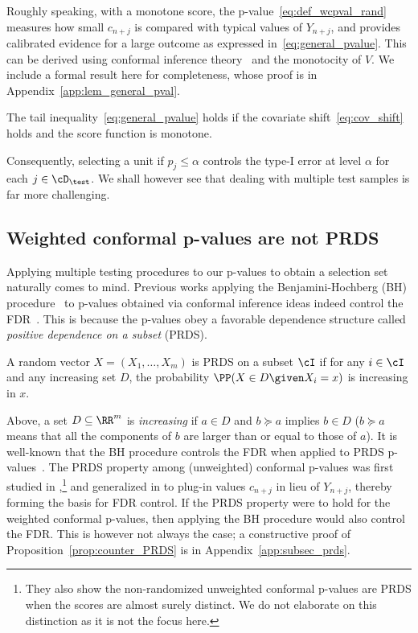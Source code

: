 {Roughly speaking, with a monotone score,
the p-value~\eqref{eq:def_wcpval_rand}
measures how small $c_{n+j}$ is compared with
typical values of $Y_{n+j}$, and provides calibrated
evidence for a large outcome as expressed in~\eqref{eq:general_pvalue}.
This can be derived using conformal inference theory~\cite{tibshirani2019conformal} and the monotocity of $V$. We include a formal result here for completeness, whose proof is
in Appendix~\ref{app:lem_general_pval}.}

\begin{lemma}\label{lem:general_pval}
The tail inequality~\eqref{eq:general_pvalue} holds
if the covariate shift~\eqref{eq:cov_shift} holds and the score function is monotone.
\end{lemma}
Consequently, selecting a unit
if $p_j \le \alpha$ controls the type-I error at level $\alpha$ for each $j\in \cD_\test$.
We shall however see that dealing with multiple test samples
is far more challenging.


\subsection{Weighted conformal p-values are not PRDS}
\label{subsec:no_PRDS}

Applying multiple testing procedures
to our p-values to obtain a selection set naturally comes to mind. Previous works
applying the  Benjamini-Hochberg (BH) procedure~\cite{benjamini1995controlling} to p-values obtained via conformal inference ideas indeed control the FDR~\cite{bates2021testing,jin2022selection,marandon2022machine}. This is because the p-values obey a favorable dependence structure called
\emph{positive dependence on a subset} (PRDS).


\begin{definition}[PRDS]
\label{def:prds}
A random vector $X=(X_1,\dots,X_m)$ is PRDS
on a subset $\cI$ if for any $i\in \cI$
and any increasing set $D$,
the probability $\PP(X\in D\given X_i=x)$ is increasing in $x$.
\end{definition}
Above, a set $D\subseteq \RR^m$ is
\emph{increasing} if $a\in D$ and $b\succeq a$ implies $b\in D$ ($b \succeq a$ means that all the components of $b$ are larger than or equal to those of $a$). It is well-known that the BH procedure
controls the FDR when applied to PRDS p-values~\cite{benjamini2001control}.
%
The PRDS property among (unweighted) conformal p-values was first studied in
\cite{bates2021testing},\footnote{They also show the non-randomized unweighted conformal
p-values are PRDS when the scores are almost surely distinct.
We do not elaborate on this distinction as it is not the focus here.}
and generalized in
\cite{jin2022selection}
to plug-in values $c_{n+j}$ in lieu of $Y_{n+j}$, thereby
forming the basis for FDR control.
%
If the PRDS property were to hold for
the weighted conformal p-values, then applying the BH procedure
would also control the FDR. This is however not always the case;
a constructive proof of Proposition~\ref{prop:counter_PRDS} is
in Appendix~\ref{app:subsec_prds}.

